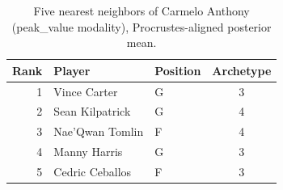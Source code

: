\begin{table}[htbp]
  \centering\small
  \begin{tabular}{rllc}
    \toprule
    Rank & Player & Position & Archetype \\
    \midrule
    1 & Vince Carter & G & 3 \\
    2 & Sean Kilpatrick & G & 4 \\
    3 & Nae'Qwan Tomlin & F & 4 \\
    4 & Manny Harris & G & 3 \\
    5 & Cedric Ceballos & F & 3 \\
    \bottomrule
  \end{tabular}
  \caption{Five nearest neighbors of Carmelo Anthony (peak_value modality), Procrustes-aligned posterior mean.}
  \label{tab:Carmelo_Anthony_neighbors_peak_value}
\end{table}

